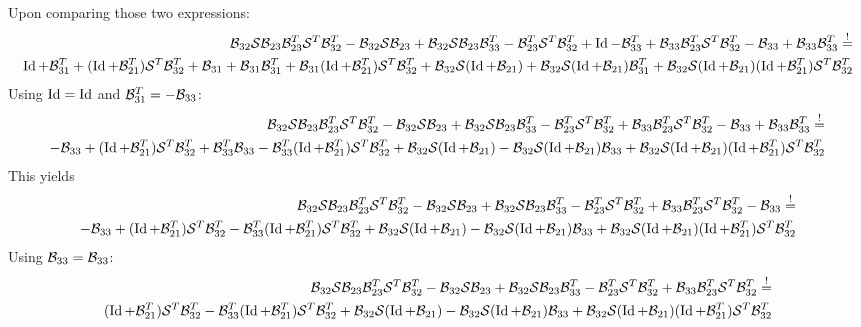 \documentclass[]{scrartcl}
\numberwithin{equation}{section}
\begin{document}
\begin{landscape}
Upon comparing those two expressions:
\begin{align*}
 \B_{32} \S \B_{23} \B_{23}^T \S^T \B_{32}^T -\B_{32} \S \B_{23} + \B_{32} \S \B_{23} \B_{33}^T -\B_{23}^T \S^T \B_{32}^T + \Id - \B_{33}^T
 + \B_{33} \B_{23}^T \S^T \B_{32}^T - \B_{33} + \B_{33} \B_{33}^T \stackrel{!}=\\
 \Id + \B_{31}^T + (\Id + \B_{21}^T) \S^T \B_{32}^T
 + \B_{31} + \B_{31} \B_{31}^T + \B_{31} (\Id + \B_{21}^T) \S^T \B_{32}^T
 + \B_{32} \S(\Id + \B_{21}) + \B_{32} \S(\Id + \B_{21}) \B_{31}^T + \B_{32} \S(\Id + \B_{21})(\Id + \B_{21}^T) \S^T \B_{32}^T
\end{align*}
Using $\Id = \Id$ and $\B_{31}^T = -\B_{33}$:
\begin{align*}
 \B_{32} \S \B_{23} \B_{23}^T \S^T \B_{32}^T -\B_{32} \S \B_{23} + \B_{32} \S \B_{23} \B_{33}^T -\B_{23}^T \S^T \B_{32}^T
 + \B_{33} \B_{23}^T \S^T \B_{32}^T - \B_{33} + \B_{33} \B_{33}^T \stackrel{!}=\\
 -\B_{33} + (\Id + \B_{21}^T) \S^T \B_{32}^T
 + \B_{33}^T \B_{33} - \B_{33}^T (\Id + \B_{21}^T) \S^T \B_{32}^T
 + \B_{32} \S(\Id + \B_{21}) - \B_{32} \S(\Id + \B_{21}) \B_{33} + \B_{32} \S(\Id + \B_{21})(\Id + \B_{21}^T) \S^T \B_{32}^T
\end{align*}
 This yields
\begin{align*}
 \B_{32} \S \B_{23} \B_{23}^T \S^T \B_{32}^T -\B_{32} \S \B_{23} + \B_{32} \S \B_{23} \B_{33}^T -\B_{23}^T \S^T \B_{32}^T
 + \B_{33} \B_{23}^T \S^T \B_{32}^T - \B_{33} \stackrel{!}=\\
 -\B_{33} + (\Id + \B_{21}^T) \S^T \B_{32}^T
  - \B_{33}^T (\Id + \B_{21}^T) \S^T \B_{32}^T
 + \B_{32} \S(\Id + \B_{21}) - \B_{32} \S(\Id + \B_{21}) \B_{33} + \B_{32} \S(\Id + \B_{21})(\Id + \B_{21}^T) \S^T \B_{32}^T
\end{align*}
Using $\B_{33} = \B_{33}$:
\begin{align*}
 \B_{32} \S \B_{23} \B_{23}^T \S^T \B_{32}^T -\B_{32} \S \B_{23} + \B_{32} \S \B_{23} \B_{33}^T -\B_{23}^T \S^T \B_{32}^T
 + \B_{33} \B_{23}^T \S^T \B_{32}^T \stackrel{!}=\\
 (\Id + \B_{21}^T) \S^T \B_{32}^T
  - \B_{33}^T (\Id + \B_{21}^T) \S^T \B_{32}^T
 + \B_{32} \S(\Id + \B_{21}) - \B_{32} \S(\Id + \B_{21}) \B_{33} + \B_{32} \S(\Id + \B_{21})(\Id + \B_{21}^T) \S^T \B_{32}^T
\end{align*}

\end{landscape}
\end{document}
